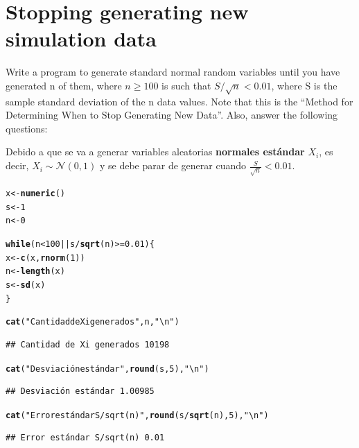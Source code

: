 \documentclass[12pt]{article}\usepackage[]{graphicx}\usepackage[]{xcolor}
\makeatletter
\newcommand{\hlnum}[1]{\textcolor[rgb]{0.686,0.059,0.569}{#1}}%
\newcommand{\hlsng}[1]{\textcolor[rgb]{0.192,0.494,0.8}{#1}}%
\newcommand{\hlopt}[1]{\textcolor[rgb]{0,0,0}{#1}}%
\newcommand{\hldef}[1]{\textcolor[rgb]{0.345,0.345,0.345}{#1}}%
\newcommand{\hlkwa}[1]{\textcolor[rgb]{0.161,0.373,0.58}{\textbf{#1}}}%
\newcommand{\hlkwb}[1]{\textcolor[rgb]{0.69,0.353,0.396}{#1}}%
\newcommand{\hlkwd}[1]{\textcolor[rgb]{0.737,0.353,0.396}{\textbf{#1}}}%
\newenvironment{kframe}{%
 \def\at@end@of@kframe{}%
 \ifinner\ifhmode%
  \def\at@end@of@kframe{\end{minipage}}%
  \begin{minipage}{\columnwidth}%
 \fi\fi%
 \def\FrameCommand##1{\hskip\@totalleftmargin \hskip-\fboxsep
 \colorbox{shadecolor}{##1}\hskip-\fboxsep
     \hskip-\linewidth \hskip-\@totalleftmargin \hskip\columnwidth}%
 \MakeFramed {\advance\hsize-\width
   \@totalleftmargin\z@ \linewidth\hsize
   \@setminipage}}%
 {\par\unskip\endMakeFramed%
 \at@end@of@kframe}
\newenvironment{knitrout}{}{} %
\makeatother
\begin{document}
\section{Stopping generating new simulation data}

Write a program to generate standard normal random variables until you have generated n of them, where $n \geq 100$ is such that $S/\sqrt{n} < 0.01$, where S is the sample standard deviation of the n data values. Note that this is the ``Method for Determining When to Stop Generating New Data''. Also, answer the following questions:



Debido a que se va a generar variables aleatorias \textbf{normales estándar} $X_{i}$, es decir, $X_{i} \sim \mathcal{N}(0, 1)$ y se debe parar de generar cuando $\frac{S}{\sqrt{n}} < 0.01$.

\begin{knitrout}
\color{fgcolor}\begin{kframe}
\begin{alltt}
\hldef{x} \hlkwb{<-} \hlkwd{numeric}\hldef{()}
\hldef{s} \hlkwb{<-} \hlnum{1}
\hldef{n} \hlkwb{<-} \hlnum{0}

\hlkwa{while}\hldef{(n} \hlopt{<} \hlnum{100} \hlopt{||} \hldef{s} \hlopt{/} \hlkwd{sqrt}\hldef{(n)} \hlopt{>=} \hlnum{0.01}\hldef{) \{}
  \hldef{x} \hlkwb{<-} \hlkwd{c}\hldef{(x,} \hlkwd{rnorm}\hldef{(}\hlnum{1}\hldef{))}
  \hldef{n} \hlkwb{<-} \hlkwd{length}\hldef{(x)}
  \hldef{s} \hlkwb{<-} \hlkwd{sd}\hldef{(x)}
\hldef{\}}

\hlkwd{cat}\hldef{(}\hlsng{"Cantidad de Xi generados"}\hldef{, n,} \hlsng{"\textbackslash{}n"}\hldef{)}
\end{alltt}
\begin{verbatim}
## Cantidad de Xi generados 10198
\end{verbatim}
\begin{alltt}
\hlkwd{cat}\hldef{(}\hlsng{"Desviación estándar"}\hldef{,} \hlkwd{round}\hldef{(s,} \hlnum{5}\hldef{),} \hlsng{"\textbackslash{}n"}\hldef{)}
\end{alltt}
\begin{verbatim}
## Desviación estándar 1.00985
\end{verbatim}
\begin{alltt}
\hlkwd{cat}\hldef{(}\hlsng{"Error estándar S/sqrt(n)"}\hldef{,} \hlkwd{round}\hldef{(s}\hlopt{/}\hlkwd{sqrt}\hldef{(n),} \hlnum{5}\hldef{),} \hlsng{"\textbackslash{}n"}\hldef{)}
\end{alltt}
\begin{verbatim}
## Error estándar S/sqrt(n) 0.01
\end{verbatim}
\end{kframe}
\end{knitrout}
\end{document}
